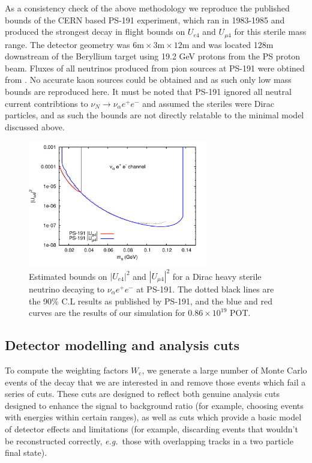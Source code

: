 \documentclass[11pt, a4paper]{article}
\def\eg{\emph{e.g.}}
\begin{document}
As a consistency check of the above methodology we reproduce the published bounds of the CERN based PS-191 experiment, which ran in 1983-1985 and produced the strongest decay in flight bounds on $U_{e4}$ and $U_{\mu 4}$ for this sterile mass range. The detector geometry was $6\text{m} \times 3\text{m} \times 12 \text{m}$ and was located 128m downstream of the Beryllium target using 19.2 GeV protons from the PS proton beam. Fluxes of all neutrinos produced from pion sources at PS-191 were obtined from \cite{ps191THesis}. No accurate kaon sources could be obtained and as such only low mass bounds are reproduced here. It must be noted that PS-191 ignored all neutral current contribtions to $\nu_N \rightarrow \nu_\alpha e^+ e^-$ and assumed the steriles were Dirac particles, and as such the bounds are not directly relatable to the minimal model discussed above.


\begin{figure}
\center
\includegraphics[width=0.7\textwidth]{figures/PS-191_test.pdf}
\caption{\label{fig:ps191test} Estimated bounds on $|U_{e4}|^2$ and $|U_{\mu 4}|^2$ for a Dirac heavy sterile neutrino decaying to $\nu_\alpha e^+ e^-$ at PS-191. The dotted black lines are the 90\% C.L results as published by PS-191, and the blue and red curves are the results of our simulation for $0.86 \times 10^{19}$ POT.}
\end{figure}

\subsection{Detector modelling and analysis cuts}

To compute the weighting factors $W_\text{c}$, we generate a large number of
Monte Carlo events of the decay that we are interested in and remove those
events which fail a series of cuts. These cuts are designed to reflect both
genuine analysis cuts designed to enhance the signal to background ratio (for
example, choosing events with energies within certain ranges), as well as cuts
which provide a basic model of detector effects and limitations (for example,
discarding events that wouldn't be reconstructed correctly, \eg\ those with
overlapping tracks in a two particle final state).
\end{document}

